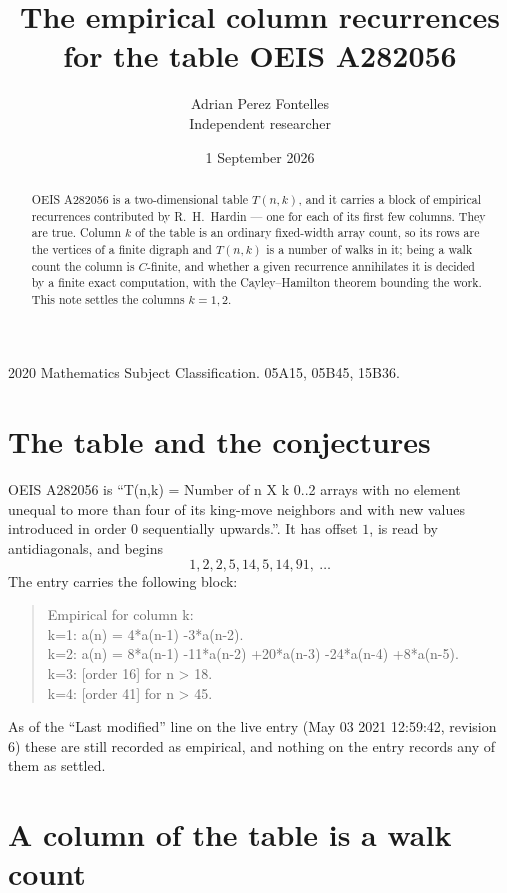 \documentclass[11pt,a4paper]{article}
\title{The empirical column recurrences for the table OEIS A282056}
\author{Adrian Perez Fontelles\\ \small Independent researcher}
\date{1 September 2026}
\theoremstyle{plain}
\theoremstyle{definition}
\begin{document}
\maketitle

\begin{abstract}
OEIS A282056 is a two-dimensional table $T(n,k)$, and it carries a block of empirical
recurrences contributed by R.~H.~Hardin --- one for each of its first few columns. They are
true. Column $k$ of the table is an ordinary fixed-width array count, so its rows are the
vertices of a finite digraph and $T(n,k)$ is a number of walks in it; being a walk count the
column is $C$-finite, and whether a given recurrence annihilates it is decided by a finite
exact computation, with the Cayley--Hamilton theorem bounding the work. This note settles the columns $k=1, 2$.
\end{abstract}

\noindent\small 2020 Mathematics Subject Classification. 05A15, 05B45, 15B36.\normalsize

\section{The table and the conjectures}

OEIS A282056 is ``T(n,k) = Number of n X k 0..2 arrays with no element unequal to more than four of its king-move neighbors and with new values introduced in order 0 sequentially upwards.''. It has offset $1$, is
read by antidiagonals, and begins
\[
1, 2, 2, 5, 14, 5, 14, 91,\ \dots
\]
The entry carries the following block:
\begin{quote}\small
Empirical for column k:\\
k=1: a(n) = 4*a(n-1) -3*a(n-2).\\
k=2: a(n) = 8*a(n-1) -11*a(n-2) +20*a(n-3) -24*a(n-4) +8*a(n-5).\\
k=3: [order 16] for n > 18.\\
k=4: [order 41] for n > 45.\\
\end{quote}
As of the ``Last modified'' line on the live entry (May 03 2021 12:59:42, revision 6) these are still
recorded as empirical, and nothing on the entry records any of them as settled.

\section{A column of the table is a walk count}
\end{document}
